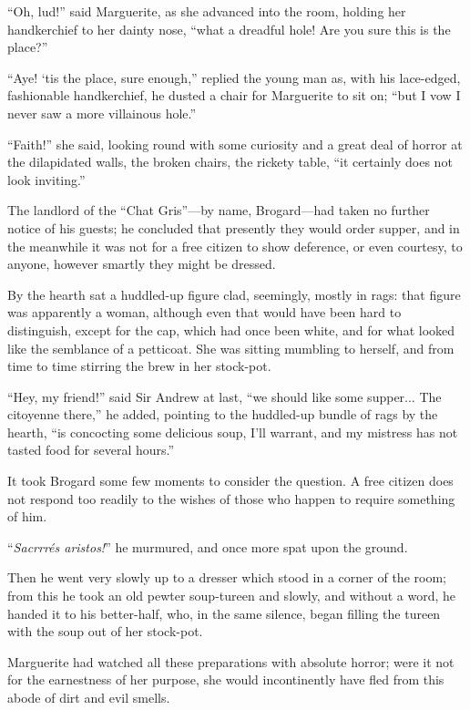 \documentclass[paper=a5,BCOR=7mm,twoside,DIV=calc,12pt,usegeometry,chapterprefix,endperiod,headings=big]{scrbook}
\begin{document}
\enquote{Oh, lud!} said Marguerite, as she advanced into the room, holding her handkerchief to her dainty nose, \enquote{what a dreadful hole! Are you sure this is the place?}

\enquote{Aye! `tis the place, sure enough,} replied the young man as, with his lace-edged, fashionable handkerchief, he dusted a chair for Marguerite to sit on; \enquote{but I vow I never saw a more villainous hole.}

\enquote{Faith!} she said, looking round with some curiosity and a great deal of horror at the dilapidated walls, the broken chairs, the rickety table, \enquote{it certainly does not look inviting.}

The landlord of the \enquote{Chat Gris}---by name, Brogard---had taken no further notice of his guests; he concluded that presently they would order supper, and in the meanwhile it was not for a free citizen to show deference, or even courtesy, to anyone, however smartly they might be dressed.

By the hearth sat a huddled-up figure clad, seemingly, mostly in rags: that figure was apparently a woman, although even that would have been hard to distinguish, except for the cap, which had once been white, and for what looked like the semblance of a petticoat. She was sitting mumbling to herself, and from time to time stirring the brew in her stock-pot.

\enquote{Hey, my friend!} said Sir Andrew at last, \enquote{we should like some supper... The citoyenne there,} he added, pointing to the huddled-up bundle of rags by the hearth, \enquote{is concocting some delicious soup, I'll warrant, and my mistress has not tasted food for several hours.}

It took Brogard some few moments to consider the question. A free citizen does not respond too readily to the wishes of those who happen to require something of him.

\enquote{\textit{Sacrrrés aristos!}} he murmured, and once more spat upon the ground.

Then he went very slowly up to a dresser which stood in a corner of the room; from this he took an old pewter soup-tureen and slowly, and without a word, he handed it to his better-half, who, in the same silence, began filling the tureen with the soup out of her stock-pot.

Marguerite had watched all these preparations with absolute horror; were it not for the earnestness of her purpose, she would incontinently have fled from this abode of dirt and evil smells.
\end{document}
